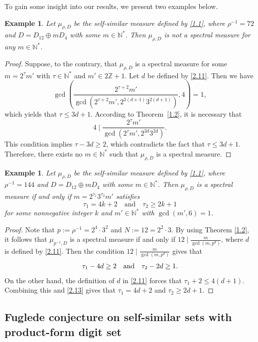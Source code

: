 \documentclass[11pt]{article}
\newtheorem{example}[theorem]{Example}
\numberwithin{equation}{section}
\begin{document}
To gain some insight into our results, we present two examples below. 
\begin{example}
	Let $\mu_{\rho,D}$ be the self-similar measure defined by \eqref{1.1}, where
	$\rho^{-1}=72$ and $D=D_{12}\oplus mD_4$ with some $m\in \mathbb{N}^*$. Then $\mu_{\rho,D}$ is not a spectral measure for any $m\in\mathbb{N}^*$.
\end{example}

\begin{proof}
	Suppose, to the contrary, that $\mu_{\rho,D}$ is a spectral measure for some
	$m=2^\tau m'$ with $\tau\in\mathbb{N}^*$ and $m'\in 2\mathbb{Z}+1$. Let $d$ be defined by \eqref{2.11}. Then we have
$$\gcd\left(\frac{2^{\tau+2}m'}{\gcd(2^{\tau+2}m',2^{3(d+1)}3^{2(d+1)})},4\right)=1,$$
which yields that $\tau\leq 3d+1$.
	According to Theorem~\ref{1.2}, it is necessary that
\[4 \mid \frac{2^{\tau}m'}{\gcd(2^{\tau}m',2^{3d}3^{2d})}.
	\]
	This condition implies $\tau-3d\ge 2$, which contradicts the fact that
	$\tau\leq 3d+1$. Therefore, there exists no
	$m\in\mathbb{N}^*$ such that $\mu_{\rho,D}$ is a spectral measure.
\end{proof}


\begin{example}
	Let $\mu_{\rho,D}$ be the self-similar measure defined by \eqref{1.1}, where
	$\rho^{-1}=144$ and $D=D_{12}\oplus mD_4$ with some $m\in \mathbb{N}^*$. Then $\mu_{\rho,D}$ is a
	spectral measure if and only if
	$
	m=2^{\tau_1}3^{\tau_2}m'
	$  satisfies
\[
	\tau_1=4k+2 \quad\text{and}\quad \tau_2\ge 2k+1
	\]
 for some nonnegative integer $k$ and $m' \in \mathbb{N}^*$ with $\gcd(m',6)=1$.
\end{example}

\begin{proof}
Note that $p:=\rho^{-1}=2^4\cdot 3^2$
 and $N:=12=2^2\cdot 3$. By using Theorem \ref{1.2}, it follows that $\mu_{p^{-1},D}$ is a spectral measure if and only if $12\mid \frac{m}{\gcd(m,p^d)}$, where $d$ is defined by \eqref{2.11}.
 Then the condition $12\mid \frac{m}{\gcd(m,p^d)}$ gives that
\begin{equation}\label{2.13}
\tau_1-4d\geq2\quad {\rm{and}}\quad \tau_2-2 d\geq 1.
\end{equation}
On the other hand, the definition of $d$ in \eqref{2.11} forces that $\tau_1+2\leq 4(d+1)$. Combining this and \eqref{2.13} gives that $\tau_1=4d+2$ and $\tau_2\geq 2d+1$.
\end{proof}


\subsection{Fuglede conjecture on self-similar sets with product-form digit set}
\end{document}
